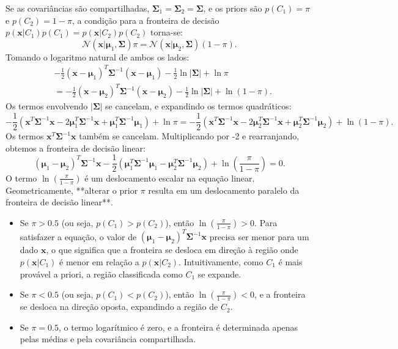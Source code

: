 \documentclass{article}
\begin{document}
Se as covariâncias são compartilhadas, $\boldsymbol{\Sigma}_1 = \boldsymbol{\Sigma}_2 = \boldsymbol{\Sigma}$, e os priors são $p(C_1) = \pi$ e $p(C_2) = 1 - \pi$, a condição para a fronteira de decisão $p(\mathbf{x} | C_1) p(C_1) = p(\mathbf{x} | C_2) p(C_2)$ torna-se:
\[
\mathcal{N}(\mathbf{x} | \boldsymbol{\mu}_1, \boldsymbol{\Sigma}) \pi = \mathcal{N}(\mathbf{x} | \boldsymbol{\mu}_2, \boldsymbol{\Sigma}) (1 - \pi).
\]
Tomando o logaritmo natural de ambos os lados:
\begin{align*}
& -\frac{1}{2} (\mathbf{x} - \boldsymbol{\mu}_1)^T \boldsymbol{\Sigma}^{-1} (\mathbf{x} - \boldsymbol{\mu}_1) - \frac{1}{2} \ln |\boldsymbol{\Sigma}| + \ln \pi \\
&= -\frac{1}{2} (\mathbf{x} - \boldsymbol{\mu}_2)^T \boldsymbol{\Sigma}^{-1} (\mathbf{x} - \boldsymbol{\mu}_2) - \frac{1}{2} \ln |\boldsymbol{\Sigma}| + \ln (1 - \pi).
\end{align*}
Os termos envolvendo $|\boldsymbol{\Sigma}|$ se cancelam, e expandindo os termos quadráticos:
\[
-\frac{1}{2} (\mathbf{x}^T \boldsymbol{\Sigma}^{-1} \mathbf{x} - 2 \boldsymbol{\mu}_1^T \boldsymbol{\Sigma}^{-1} \mathbf{x} + \boldsymbol{\mu}_1^T \boldsymbol{\Sigma}^{-1} \boldsymbol{\mu}_1) + \ln \pi = -\frac{1}{2} (\mathbf{x}^T \boldsymbol{\Sigma}^{-1} \mathbf{x} - 2 \boldsymbol{\mu}_2^T \boldsymbol{\Sigma}^{-1} \mathbf{x} + \boldsymbol{\mu}_2^T \boldsymbol{\Sigma}^{-1} \boldsymbol{\mu}_2) + \ln (1 - \pi).
\]
Os termos $\mathbf{x}^T \boldsymbol{\Sigma}^{-1} \mathbf{x}$ também se cancelam. Multiplicando por -2 e rearranjando, obtemos a fronteira de decisão linear:
\[
(\boldsymbol{\mu}_1 - \boldsymbol{\mu}_2)^T \boldsymbol{\Sigma}^{-1} \mathbf{x} - \frac{1}{2} (\boldsymbol{\mu}_1^T \boldsymbol{\Sigma}^{-1} \boldsymbol{\mu}_1 - \boldsymbol{\mu}_2^T \boldsymbol{\Sigma}^{-1} \boldsymbol{\mu}_2) + \ln \left(\frac{\pi}{1 - \pi}\right) = 0.
\]
O termo $\ln \left(\frac{\pi}{1 - \pi}\right)$ é um deslocamento escalar na equação linear. Geometricamente, **alterar o prior $\pi$ resulta em um deslocamento paralelo da fronteira de decisão linear**.
\begin{itemize}
    \item Se $\pi > 0.5$ (ou seja, $p(C_1) > p(C_2)$), então $\ln \left(\frac{\pi}{1 - \pi}\right) > 0$. Para satisfazer a equação, o valor de $(\boldsymbol{\mu}_1 - \boldsymbol{\mu}_2)^T \boldsymbol{\Sigma}^{-1} \mathbf{x}$ precisa ser menor para um dado $\mathbf{x}$, o que significa que a fronteira se desloca em direção à região onde $p(\mathbf{x} | C_1)$ é menor em relação a $p(\mathbf{x} | C_2)$. Intuitivamente, como $C_1$ é mais provável a priori, a região classificada como $C_1$ se expande.
    \item Se $\pi < 0.5$ (ou seja, $p(C_1) < p(C_2)$), então $\ln \left(\frac{\pi}{1 - \pi}\right) < 0$, e a fronteira se desloca na direção oposta, expandindo a região de $C_2$.
    \item Se $\pi = 0.5$, o termo logarítmico é zero, e a fronteira é determinada apenas pelas médias e pela covariância compartilhada.
\end{itemize}
\end{document}
